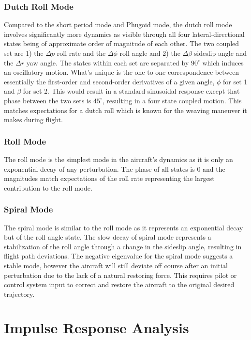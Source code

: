 \documentclass[11pt]{article}
\begin{document}
\subsubsection*{Dutch Roll Mode}

Compared to the short period mode and Phugoid mode, the dutch roll mode involves significantly more dynamics as visible
through all four lateral-directional states being of approximate order of magnitude of each other.
The two coupled set are 1) the $\Delta p$ roll rate and the $\Delta \phi$ roll angle and 2) the $\Delta \beta$ sideslip
angle and the $\Delta r$ yaw angle.
The states within each set are separated by $90^\circ$ which induces an oscillatory motion.
What's unique is the one-to-one correspondence between essentially the first-order and second-order derivatives of a
given angle, $\phi$ for set 1 and $\beta$ for set 2.
This would result in a standard sinusoidal response except that phase between the two sets is $45^\circ$, resulting in a
four state coupled motion.
This matches expectations for a dutch roll which is known for the weaving maneuver it makes during flight.

\subsubsection*{Roll Mode}

The roll mode is the simplest mode in the aircraft's dynamics as it is only an exponential decay of any perturbation.
The phase of all states is 0 and the magnitudes match expectations of the roll rate representing the largest
contribution to the roll mode.

\subsubsection*{Spiral Mode}

The spiral mode is similar to the roll mode as it represents an exponential decay but of the roll angle state.
The slow decay of spiral mode represents a stabilization of the roll angle through a change in the sideslip angle,
resulting in flight path deviations.
The negative eigenvalue for the spiral mode suggests a stable mode, however the aircraft will still deviate off course
after an initial perturbation due to the lack of a natural restoring force.
This requires pilot or control system input to correct and restore the aircraft to the original desired trajectory.

\newpage

\section{Impulse Response Analysis}
\end{document}
